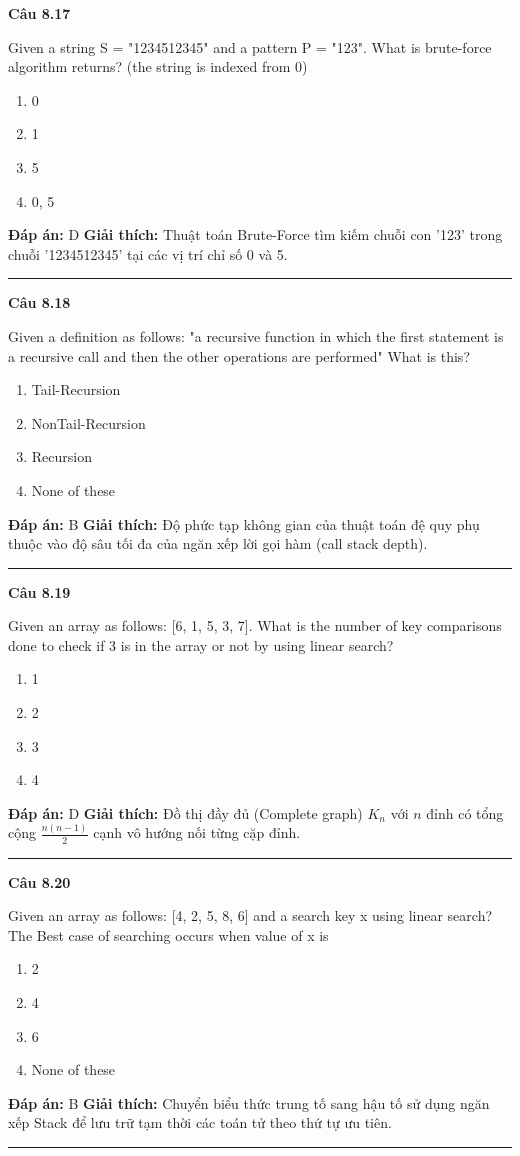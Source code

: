 \documentclass[11pt,a4paper]{article}
\newenvironment{question}[1]{%
  \par\vspace{1em}\noindent\textbf{\large Câu #1}\par\vspace{0.4em}
}{%
  \par\vspace{1em}\hrule\vspace{0.6em}
}
\newenvironment{choices}{%
  \begin{enumerate}[label=\textbf{\Alph*.},leftmargin=2.2em,itemsep=2pt,topsep=3pt]
}{%
  \end{enumerate}
}
\newcommand{\choice}{\item}
\begin{document}
\begin{question}{8.17}
Given a string S = "1234512345" and a pattern P = "123". What is brute-force algorithm returns? (the string is indexed from 0)
\begin{choices}
\choice 0
\choice 1
\choice 5
\choice 0, 5
\end{choices}
\textbf{Đáp án:} D
\textbf{Giải thích:} Thuật toán Brute-Force tìm kiếm chuỗi con '123' trong chuỗi '1234512345' tại các vị trí chỉ số 0 và 5.
\end{question}

\begin{question}{8.18}
Given a definition as follows: "a recursive function in which the first statement is a recursive call and then the other operations are performed" What is this?
\begin{choices}
\choice Tail-Recursion
\choice NonTail-Recursion
\choice Recursion
\choice None of these
\end{choices}
\textbf{Đáp án:} B
\textbf{Giải thích:} Độ phức tạp không gian của thuật toán đệ quy phụ thuộc vào độ sâu tối đa của ngăn xếp lời gọi hàm (call stack depth).
\end{question}

\begin{question}{8.19}
Given an array as follows: [6, 1, 5, 3, 7]. What is the number of key comparisons done to check if 3 is in the array or not by using linear search?
\begin{choices}
\choice 1
\choice 2
\choice 3
\choice 4
\end{choices}
\textbf{Đáp án:} D
\textbf{Giải thích:} Đồ thị đầy đủ (Complete graph) \(K_n\) với \(n\) đỉnh có tổng cộng \(\frac{n(n-1)}{2}\) cạnh vô hướng nối từng cặp đỉnh.
\end{question}

\begin{question}{8.20}
Given an array as follows: [4, 2, 5, 8, 6] and a search key x using linear search? The Best case of searching occurs when value of x is
\begin{choices}
\choice 2
\choice 4
\choice 6
\choice None of these
\end{choices}
\textbf{Đáp án:} B
\textbf{Giải thích:} Chuyển biểu thức trung tố sang hậu tố sử dụng ngăn xếp Stack để lưu trữ tạm thời các toán tử theo thứ tự ưu tiên.
\end{question}
\end{document}
